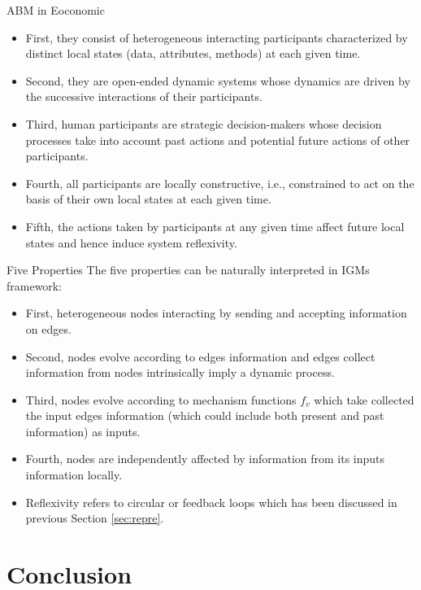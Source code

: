 \documentclass[10pt]{beamer}
\begin{document}
\begin{CJK*}{UTF8}{gbsn}
\begin{frame}{ABM in Eoconomic}
\begin{itemize}
    \item  First, they consist of heterogeneous interacting participants characterized by distinct local states (data, attributes, methods) at each given time. 
    \item Second, they are open-ended dynamic systems whose dynamics are driven by the successive interactions of their participants. 
    \item Third, human participants are strategic decision-makers whose decision processes take into account past actions and potential future actions of other participants. 
    \item Fourth, all participants are locally constructive, i.e., constrained to act on the basis of their own local states at each given time. 
    \item Fifth, the actions taken by participants at any given time affect future local states and hence induce system reflexivity.
\end{itemize}
    
\end{frame}

\begin{frame}{Five Properties}
    The five properties can be naturally interpreted in IGMs framework:
    
    \begin{itemize}
    \item First, heterogeneous nodes interacting by sending and accepting information on edges.
    \item Second, nodes evolve according to edges information and edges collect information from nodes intrinsically imply a dynamic process. %
    \item Third, nodes evolve according to mechanism functions $f_v$ which take collected the input edges information (which could include both present and past information) as inputs.
    \item Fourth, nodes are independently affected by information from its inputs information locally.
    \item Reflexivity refers to circular or feedback loops which has been discussed in previous Section \ref{sec:repre}.
\end{itemize} 

\end{frame}

\section{Conclusion}


\end{CJK*}
\end{document}
